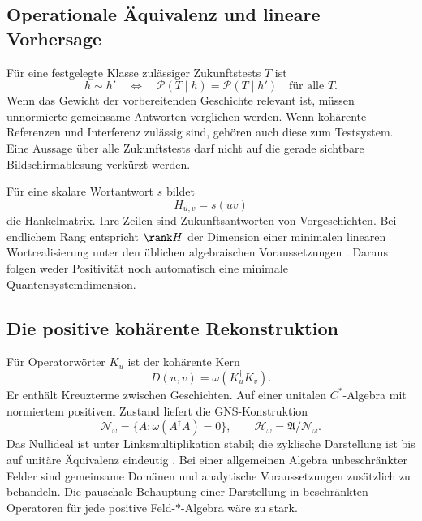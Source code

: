 
\subsection{Operationale Äquivalenz und lineare Vorhersage}
Für eine festgelegte Klasse zulässiger Zukunftstests $T$ ist
\begin{equation}
h\sim h'\quad\Longleftrightarrow\quad
\mathcal P(T\mid h)=\mathcal P(T\mid h')\quad\text{für alle }T.
\end{equation}
Wenn das Gewicht der vorbereitenden Geschichte relevant ist, müssen unnormierte gemeinsame Antworten verglichen werden. Wenn kohärente Referenzen und Interferenz zulässig sind, gehören auch diese zum Testsystem. Eine Aussage über alle Zukunftstests darf nicht auf die gerade sichtbare Bildschirmablesung verkürzt werden.

Für eine skalare Wortantwort $s$ bildet
\begin{equation}
H_{u,v}=s(uv)
\end{equation}
die Hankelmatrix. Ihre Zeilen sind Zukunftsantworten von Vorgeschichten. Bei endlichem Rang entspricht $\rank H$ der Dimension einer minimalen linearen Wortrealisierung unter den üblichen algebraischen Voraussetzungen \cite{carlyle,thon}. Daraus folgen weder Positivität noch automatisch eine minimale Quantensystemdimension.

\subsection{Die positive kohärente Rekonstruktion}
Für Operatorwörter $K_u$ ist der kohärente Kern
\begin{equation}
D(u,v)=\omega(K_u^\dagger K_v).
\end{equation}
Er enthält Kreuzterme zwischen Geschichten. Auf einer unitalen $C^*$-Algebra mit normiertem positivem Zustand liefert die GNS-Konstruktion
\begin{equation}
\mathcal N_\omega=\{A:\omega(A^\dagger A)=0\},\qquad
\mathcal H_\omega=\overline{\mathfrak A/\mathcal N_\omega}.
\end{equation}
Das Nullideal ist unter Linksmultiplikation stabil; die zyklische Darstellung ist bis auf unitäre Äquivalenz eindeutig \cite{segal}. Bei einer allgemeinen Algebra unbeschränkter Felder sind gemeinsame Domänen und analytische Voraussetzungen zusätzlich zu behandeln. Die pauschale Behauptung einer Darstellung in beschränkten Operatoren für jede positive Feld-$*$-Algebra wäre zu stark.

